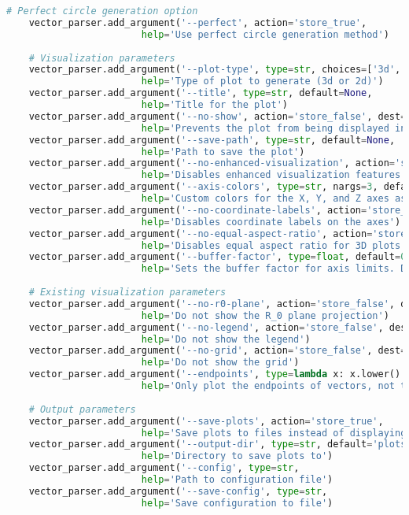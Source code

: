 \begin{lstlisting}[language=Python]
    # Perfect circle generation option
    vector_parser.add_argument('--perfect', action='store_true',
                        help='Use perfect circle generation method')
    
    # Visualization parameters
    vector_parser.add_argument('--plot-type', type=str, choices=['3d', '2d'], default='3d',
                        help='Type of plot to generate (3d or 2d)')
    vector_parser.add_argument('--title', type=str, default=None,
                        help='Title for the plot')
    vector_parser.add_argument('--no-show', action='store_false', dest='show_plot',
                        help='Prevents the plot from being displayed interactively')
    vector_parser.add_argument('--save-path', type=str, default=None,
                        help='Path to save the plot')
    vector_parser.add_argument('--no-enhanced-visualization', action='store_false', dest='enhanced_visualization',
                        help='Disables enhanced visualization features')
    vector_parser.add_argument('--axis-colors', type=str, nargs=3, default=['r', 'g', 'b'],
                        help='Custom colors for the X, Y, and Z axes as three space-separated values')
    vector_parser.add_argument('--no-coordinate-labels', action='store_false', dest='show_coordinate_labels',
                        help='Disables coordinate labels on the axes')
    vector_parser.add_argument('--no-equal-aspect-ratio', action='store_false', dest='equal_aspect_ratio',
                        help='Disables equal aspect ratio for 3D plots')
    vector_parser.add_argument('--buffer-factor', type=float, default=0.2,
                        help='Sets the buffer factor for axis limits. Default: 0.2')
    
    # Existing visualization parameters
    vector_parser.add_argument('--no-r0-plane', action='store_false', dest='show_r0_plane',
                        help='Do not show the R_0 plane projection')
    vector_parser.add_argument('--no-legend', action='store_false', dest='show_legend',
                        help='Do not show the legend')
    vector_parser.add_argument('--no-grid', action='store_false', dest='show_grid',
                        help='Do not show the grid')
    vector_parser.add_argument('--endpoints', type=lambda x: x.lower() == 'true', default=False,
                        help='Only plot the endpoints of vectors, not the arrows')
    
    # Output parameters
    vector_parser.add_argument('--save-plots', action='store_true',
                        help='Save plots to files instead of displaying them')
    vector_parser.add_argument('--output-dir', type=str, default='plots',
                        help='Directory to save plots to')
    vector_parser.add_argument('--config', type=str,
                        help='Path to configuration file')
    vector_parser.add_argument('--save-config', type=str,
                        help='Save configuration to file')
    

\end{lstlisting}
